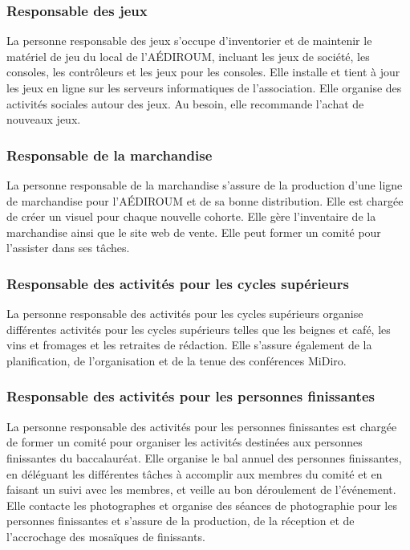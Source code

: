 \documentclass{aediroum}
\begin{document}
\subsubsection{Responsable des jeux}\label{sec:responsable-serveur}

La personne responsable des jeux s’occupe d’inventorier et de maintenir le matériel de jeu du local de l’AÉDIROUM, incluant les jeux de société, les consoles, les contrôleurs et les jeux pour les consoles.
Elle installe et tient à jour les jeux en ligne sur les serveurs informatiques de l’association. 
Elle organise des activités sociales autour des jeux.
Au besoin, elle recommande l’achat de nouveaux jeux.

\subsubsection{Responsable de la marchandise}

La personne responsable de la marchandise s'assure de la production d’une ligne de marchandise pour l'AÉDIROUM et de sa bonne distribution.
Elle est chargée de créer un visuel pour chaque nouvelle cohorte.
Elle gère l’inventaire de la marchandise ainsi que le site web de vente.
Elle peut former un comité pour l’assister dans ses tâches.

\subsubsection{Responsable des activités pour les cycles supérieurs}

La personne responsable des activités pour les cycles supérieurs organise différentes activités pour les cycles supérieurs telles que les beignes et café, les vins et fromages et les retraites de rédaction.
Elle s’assure également de la planification, de l’organisation et de la tenue des conférences MiDiro.

\subsubsection{Responsable des activités pour les personnes finissantes}

La personne responsable des activités pour les personnes finissantes est chargée de former un comité pour organiser les activités destinées aux personnes finissantes du baccalauréat.
Elle organise le bal annuel des personnes finissantes, en déléguant les différentes tâches à accomplir aux membres du comité et en faisant un suivi avec les membres, et veille au bon déroulement de l’événement.
Elle contacte les photographes et organise des séances de photographie pour les personnes finissantes et s’assure de la production, de la réception et de l’accrochage des mosaïques de finissants.
\end{document}
